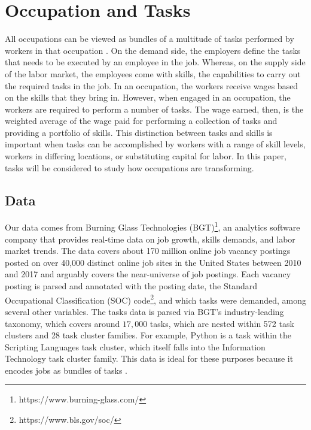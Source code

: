 \documentclass[letterpaper]{article} %
\begin{document}
\section{Occupation and Tasks}
\label{sec:data}
%
All occupations can be viewed as bundles of a multitude of tasks performed by workers in that occupation \cite{Acemoglu2018c}. On the demand side, the employers define the tasks that needs to be executed by an employee in the job. Whereas, on the supply side of the labor market, the employees come with skills, the capabilities to carry out the required tasks in the job. In an occupation, the workers receive wages based on the skills that they bring in. However, when engaged in an occupation, the workers are required to perform a number of tasks. The wage earned, then, is the weighted average of the wage paid for performing a collection of tasks and providing a portfolio of skills. This distinction between tasks and skills is important when tasks can be accomplished by workers with a range of skill levels, workers in differing locations, or substituting capital for labor. In this paper, tasks will be considered to study how occupations are transforming. 

\subsection{Data}
\label{subsec:data} Our data comes from Burning Glass Technologies (BGT)\footnote{https://www.burning-glass.com/}, an analytics software company that provides real-time data on job growth, skills demands, and labor market trends. The data covers about 170 million online job vacancy postings posted on over 40,000 distinct online job sites in the United States between 2010 and 2017 and arguably covers the near-universe of job postings. Each vacancy posting is parsed and annotated with the posting date, the Standard Occupational Classification (SOC) code\footnote{https://www.bls.gov/soc/}, and which tasks were demanded, among several other variables. The tasks data is parsed via BGT's industry-leading taxonomy, which covers around $17,000$ tasks, which are nested within 572 task clusters and 28 task cluster families. For example, Python is a task within the Scripting Languages task cluster, which itself falls into the Information Technology task cluster family. This data is ideal for these purposes because it encodes jobs as bundles of tasks \cite{Deming2018}. 
\end{document}
